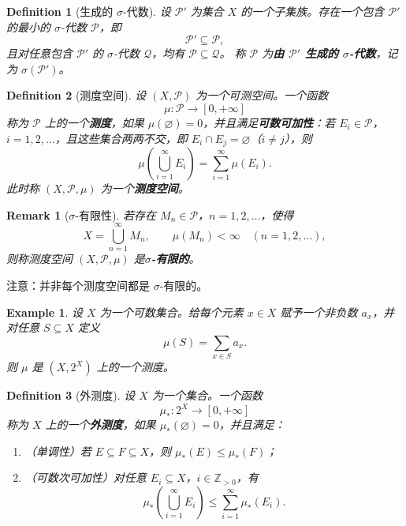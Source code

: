 \documentclass[12pt,letterpaper,twoside,openright]{ctexbook}
\theoremstyle{bluehead}
\theoremstyle{olivehead}
\newtheorem{definition}{Definition}
\theoremstyle{orangehead}
\newtheorem{example}[theorem]{Example}
\theoremstyle{redremark}
\newtheorem*{remark}{Remark}
\begin{document}
\begin{definition}[生成的 $\sigma$-代数]
设 $\mathcal{P}'$ 为集合 $X$ 的一个子集族。存在一个包含 $\mathcal{P}'$ 的最小的 $\sigma$-代数 $\mathcal{P}$，即
\[
  \mathcal{P}' \subseteq \mathcal{P},
\]
且对任意包含 $\mathcal{P}'$ 的 $\sigma$-代数 $\mathcal{Q}$，均有 $\mathcal{P} \subseteq \mathcal{Q}$。
称 $\mathcal{P}$ 为\textbf{由 $\mathcal{P}'$ 生成的 $\sigma$-代数}，记为 $\sigma(\mathcal{P}')$。
\end{definition}
\begin{definition}[测度空间]
设 $(X,\mathcal{P})$ 为一个可测空间。一个函数
\[
  \mu\colon \mathcal{P} \longrightarrow [0,+\infty]
\]
称为 $\mathcal{P}$ 上的一个\textbf{测度}，如果 $\mu(\varnothing)=0$，并且满足\textbf{可数可加性}：若 $E_i\in\mathcal{P}$，$i=1,2,\ldots$，且这些集合两两不交，即 $E_i\cap E_j=\varnothing$（$i\ne j$），则
\[
  \mu\!\left(\bigcup_{i=1}^{\infty} E_i\right)
  = \sum_{i=1}^{\infty} \mu(E_i).
\]
此时称 $(X,\mathcal{P},\mu)$ 为一个\textbf{测度空间}。
\end{definition}
\begin{remark}[\textrm{$\sigma$-有限性}]
若存在 $M_n\in\mathcal{P}$，$n=1,2,\ldots$，使得
\[
  X=\bigcup_{n=1}^{\infty}M_n,
  \qquad \mu(M_n)<\infty \quad (n=1,2,\ldots),
\]
则称测度空间 $(X,\mathcal{P},\mu)$ 是\textbf{$\sigma$-有限的}。
\end{remark}
注意：并非每个测度空间都是 $\sigma$-有限的。

\begin{example}
设 $X$ 为一个可数集合。给每个元素 $x\in X$ 赋予一个非负数 $a_x$，并对任意 $S\subseteq X$ 定义
\[
  \mu(S)=\sum_{x\in S}a_x.
\]
则 $\mu$ 是 $(X,2^X)$ 上的一个测度。
\end{example}
\begin{definition}[外测度]
设 $X$ 为一个集合。一个函数
\[
  \mu_*\colon 2^X\longrightarrow[0,+\infty]
\]
称为 $X$ 上的一个\textbf{外测度}，如果 $\mu_*(\varnothing)=0$，并且满足：
\begin{enumerate}
  \item （单调性）若 $E\subseteq F\subseteq X$，则 $\mu_*(E)\leq\mu_*(F)$；
  \item （可数次可加性）对任意 $E_i\subseteq X$，$i\in\mathbb{Z}_{>0}$，有
  \[
    \mu_*\!\left(\bigcup_{i=1}^{\infty}E_i\right)
    \leq\sum_{i=1}^{\infty}\mu_*(E_i).
  \]
\end{enumerate}
\end{definition}
\end{document}

